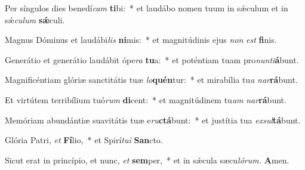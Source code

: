 \item Per síngulos dies benedí\textit{cam} \textbf{ti}bi:~* et laudábo nomen tuum in sǽculum et in sǽ\hspace*{0.02em}\textit{culum} \textbf{sǽ}culi.
\item Magnus Dóminus et laudábi\textit{lis} \textbf{ni}mis:~* et magnitúdinis ejus \textit{non} \textit{est} \textbf{fi}nis.
\item Generátio et generátio laudábit ópe\textit{ra} \textbf{tu}a:~* et poténtiam tuam pro\textit{nunti}\textbf{á}bunt.
\item Magnificéntiam glóriæ sanctitátis tuæ \textit{lo}\textbf{quén}tur:~* et mirabília tu\hspace*{0.02em}\textit{a} \textit{nar}\textbf{rá}bunt.
\item Et virtútem terribílium tuó\textit{rum} \textbf{di}cent:~* et magnitúdinem tu\hspace*{0.02em}\textit{am} \textit{nar}\textbf{rá}bunt.
\item Memóriam abundántiæ suavitátis tuæ e\textit{ru}\textbf{ctá}bunt:~* et justítia tua \textit{exsul}\textbf{tá}bunt.
\item Glória Patri, \textit{et} \textbf{Fí}lio,~* et Spirí\tinyhspace\textit{tui} \textbf{San}cto.
\item Sicut erat in princípio, et nunc, \textit{et} \textbf{sem}per,~* et in sǽcula sæcu\tinyhspace\textit{lórum.} \textbf{A}men.